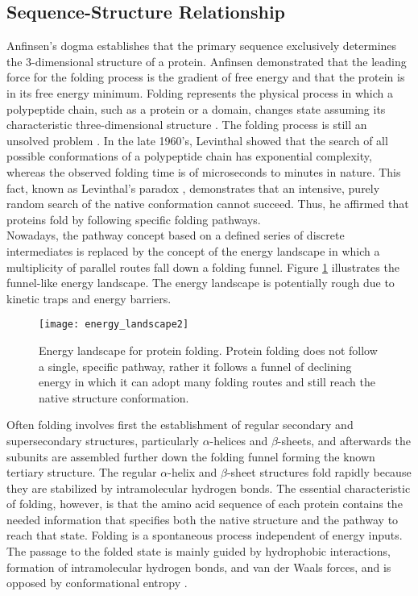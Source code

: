 \subsection{Sequence-Structure Relationship}
\label{subsec:sequence_structure_relationship}
Anfinsen's dogma \cite{Anfinsen1973aa} establishes that the primary sequence exclusively determines the 3-dimensional structure of a protein. Anfinsen demonstrated that the leading force for the folding process is the gradient of free energy and that the protein  is in its free energy minimum. Folding represents the physical process in which a polypeptide chain, such as a protein or a domain, changes state assuming its characteristic three-\-di\-men\-sio\-nal structure \cite{Lindorff-Larsen2005aa}. The folding process is still an unsolved problem \cite{Rose2006aa}. In the late 1960's, Levinthal showed that the search of all possible conformations of a polypeptide chain has exponential complexity, whereas the observed folding time is of microseconds to minutes in nature. This fact, known as Levinthal's paradox \cite{Levinthal1968aa}, demonstrates that an intensive, purely random search of the native conformation cannot succeed. Thus, he affirmed that proteins fold by following specific folding pathways.\\
Nowadays, the pathway concept based on a defined series of discrete intermediates is replaced by the concept of the energy landscape in which a multiplicity of parallel routes fall down a folding funnel. Figure \ref{fig:energy_landscape2} illustrates the funnel-like energy landscape.  The energy landscape is potentially rough due to kinetic traps and energy barriers.
\begin{figure}[tb]
	\begin{center}
		\texttt{[image: energy\_landscape2]}
		\caption[Energy landscape for protein folding]{Energy landscape for protein folding. Protein folding does not follow a single, specific pathway, rather it follows a funnel of declining energy in which it can adopt many folding routes and still reach the native structure conformation.}
		\label{fig:energy_landscape2}
	\end{center}
\end{figure}
Often folding involves first the establishment of regular secondary and supersecondary structures, particularly $\alpha$-helices and $\beta$-sheets, and afterwards the subunits are assembled further down the folding funnel forming the known tertiary structure. The regular $\alpha$-helix and $\beta$-sheet structures fold rapidly because they are stabilized by intramolecular hydrogen bonds. The essential characteristic of folding, however, is that the amino acid sequence of each protein contains the needed information that specifies both the native structure and the pathway to reach that state. Folding is a spontaneous process independent of energy inputs. The passage to the folded state is mainly guided by hydrophobic interactions, formation of intramolecular hydrogen bonds, and van der Waals forces, and is opposed by conformational entropy \cite{Sippl1996aa}.\\
